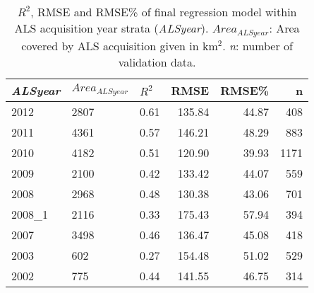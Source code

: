 \begin{table}[ht]
	\centering
	\caption{$R^2$, RMSE and RMSE\% of final regression model within ALS acquisition year strata (\textit{ALSyear}). $Area_{ALSyear}$: Area covered by ALS acquisition given in km$^2$. \textit{n}: number of validation data.}
	\label{tab:regmod:adj_r2_within}
	\begin{tabular}{lllrrr}
		\hline
		\textit{ALSyear} & $Area_{ALSyear}$ & $R^2$ & RMSE & RMSE\% & n \\ 
		\hline
 2012 & 2807   & 0.61 & 135.84 & 44.87 & 408 \\ 
 2011 & 4361  & 0.57 & 146.21 & 48.29 & 883 \\ 
 2010 & 4182 & 0.51 & 120.90 & 39.93 & 1171 \\ 
 2009 & 2100 & 0.42 & 133.42 & 44.07 & 559 \\ 
 2008 & 2968 & 0.48 & 130.38 & 43.06 & 701 \\ 
 2008\_1 & 2116 & 0.33 & 175.43 & 57.94 & 394 \\ 
 2007 & 3498 & 0.46 & 136.47 & 45.08 & 418 \\ 
 2003 & 602 & 0.27 & 154.48 & 51.02 & 529 \\ 
 2002 & 775 & 0.44 & 141.55 & 46.75 & 314 \\ 
		\hline
\hline
\end{tabular}
\end{table}

